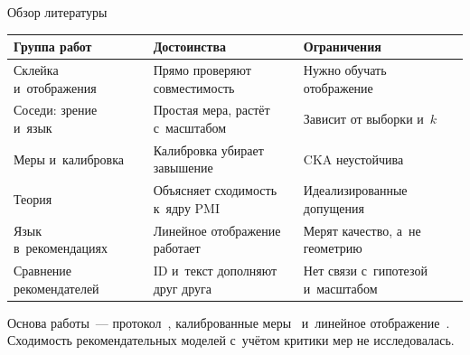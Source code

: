 \documentclass[t,aspectratio=169,11pt,hyperref={unicode}]{beamer}
\begin{document}
\begin{frame}{Обзор литературы}
\vspace{0.5em}
\begingroup
\footnotesize
\renewcommand{\arraystretch}{1.04}
\begin{tabularx}{\textwidth}{@{}>{\raggedright\arraybackslash}p{}LL@{}}
\toprule
\textbf{Группа работ} & \textbf{Достоинства} & \textbf{Ограничения} \\
\midrule
Склейка и~отображения~\cite{merullo2023linearly,moschella2023relative,bansal2021stitching,dravid2023rosetta}
  & Прямо проверяют совместимость & Нужно обучать отображение \\
Соседи: зрение и~язык~\cite{huh2024platonic,maniparambil2024,sharma2024checkup}
  & Простая мера, растёт с~масштабом & Зависит от выборки и~$k$~\cite{koepke2026cave} \\
Меры и~калибровка~\cite{groger2026aristotelian,kornblith2019cka,klabunde2025survey,davari2023cka}
  & Калибровка убирает завышение~\cite{groger2026aristotelian} & CKA неустойчива~\cite{davari2023cka} \\
Теория~\cite{huh2024platonic,balestriero2026jepa,oord2018cpc,levy2014implicit}
  & Объясняет сходимость к~ядру PMI & Идеализированные допущения \\
Язык в~рекомендациях~\cite{hou2022unisrec,li2023recformer,yuan2023idvsmodality,sheng2025alpharec}
  & Линейное отображение работает~\cite{sheng2025alpharec} & Мерят качество, а~не геометрию \\
Сравнение рекомендателей~\cite{collins2025complementarity,iana2024peeling}
  & ID и~текст дополняют друг друга~\cite{collins2025complementarity} & Нет связи с~гипотезой и~масштабом \\
\bottomrule
\end{tabularx}
\endgroup

\smallskip
\small
Основа работы~--- протокол~\cite{huh2024platonic}, калиброванные
меры~\cite{groger2026aristotelian} и~линейное отображение~\cite{sheng2025alpharec}.
Сходимость рекомендательных моделей с~учётом критики мер не исследовалась.
\end{frame}
\end{document}
